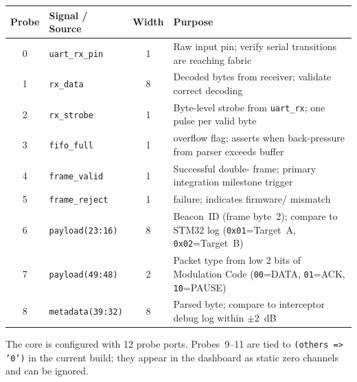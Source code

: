 \documentclass[11pt,letterpaper]{article}
\begin{document}
\begin{table}[h!]
	\centering
	\renewcommand{\arraystretch}{1.3}
	\begin{tabularx}{\textwidth}{c l c X}
		\toprule
		\textbf{Probe} & \textbf{Signal / Source} & \textbf{Width} & \textbf{Purpose} \\
		\midrule
		0 & \texttt{uart\_rx\_pin} & 1 & Raw \UART{} input pin; verify serial transitions are reaching \FPGA{} fabric \\
		1 & \texttt{rx\_data} & 8 & Decoded bytes from \UART{} receiver; validate correct decoding \\
		2 & \texttt{rx\_strobe} & 1 & Byte-level strobe from \texttt{uart\_rx}; one pulse per valid byte \\
		3 & \texttt{fifo\_full} & 1 & \FIFO{} overflow flag; asserts when back-pressure from parser exceeds buffer \\
		4 & \texttt{frame\_valid} & 1 & Successful double-\CRC{} frame; primary integration milestone trigger \\
		5 & \texttt{frame\_reject} & 1 & \CRC{} failure; indicates firmware/\RTL{} \CRC{} mismatch \\
		6 & \texttt{payload(23:16)} & 8 & Beacon~\mbox{ID} (frame byte~2); compare to STM32 log (\texttt{0x01}=Target~A, \texttt{0x02}=Target~B) \\
		7 & \texttt{payload(49:48)} & 2 & Packet type from low 2 bits of Modulation Code (\texttt{00}=DATA, \texttt{01}=ACK, \texttt{10}=PAUSE) \\
		8 & \texttt{metadata(39:32)} & 8 & Parsed \RSSI{} byte; compare to interceptor debug log within $\pm$2~dB \\
		\bottomrule
	\end{tabularx}
\end{table}

\begin{tcolorbox}[infobox={Probe count}]
	The \ILA{} core is configured with 12 probe ports. Probes~9--11 are tied to \texttt{(others => '0')} in the current build; they appear in the dashboard as static zero channels and can be ignored.
\end{tcolorbox}

\newpage
\end{document}
